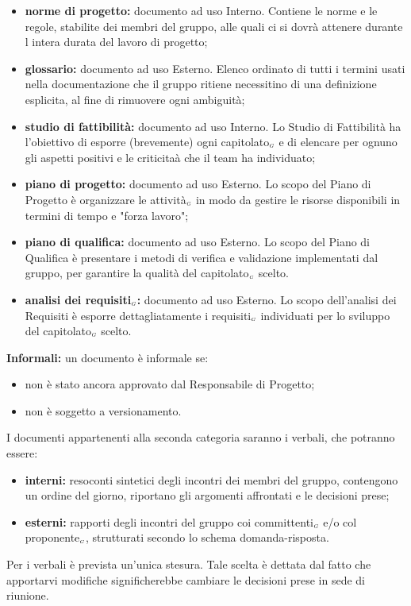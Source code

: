 \begin{itemize}
\item \textbf{norme di progetto:} documento ad uso Interno. Contiene le norme e le regole, stabilite dei membri del gruppo, alle quali ci si dovrà attenere durante l intera durata del lavoro di progetto;
	\item \textbf{glossario:} documento ad uso Esterno. Elenco ordinato di tutti i termini usati nella documentazione che il gruppo ritiene necessitino di una definizione esplicita, al fine di rimuovere ogni ambiguità;
		\item \textbf{studio di fattibilità:} documento ad uso Interno. Lo Studio di Fattibilità ha l’obiettivo di esporre (brevemente) ogni capitolato$_{\scaleto{G}{3pt}}$ e di elencare per ognuno gli aspetti positivi e le criticitaà che il team ha individuato;
			\item \textbf{piano di progetto:} documento ad uso Esterno. Lo scopo del Piano di Progetto è organizzare le attività$_{\scaleto{G}{3pt}}$ in modo da gestire le risorse disponibili in termini di tempo e "forza lavoro";
				\item \textbf{piano di qualifica:} documento ad uso Esterno. Lo scopo del Piano di Qualifica è presentare i metodi di verifica e validazione implementati dal gruppo, per garantire la qualità del capitolato$_{\scaleto{G}{3pt}}$ scelto.
					\item \textbf{analisi dei requisiti$_{\scaleto{G}{3pt}}$:} documento ad uso Esterno. Lo scopo dell'analisi dei Requisiti è esporre dettagliatamente i requisiti$_{\scaleto{G}{3pt}}$ individuati per lo sviluppo del capitolato$_{\scaleto{G}{3pt}}$ scelto.
\end{itemize}
 \textbf{Informali:} un documento è informale se:
\begin{itemize}
\item non è stato ancora approvato dal Responsabile di Progetto;
	\item non è soggetto a versionamento.
\end{itemize}
I documenti appartenenti alla seconda categoria saranno i verbali, che potranno
essere:
\begin{itemize}
\item \textbf{interni:} resoconti sintetici degli incontri dei membri del gruppo, contengono un ordine del giorno, riportano gli argomenti affrontati e le decisioni prese;
	\item \textbf{esterni:} rapporti degli incontri del gruppo coi committenti$_{\scaleto{G}{3pt}}$ e/o col proponente$_{\scaleto{G}{3pt}}$, strutturati secondo lo schema domanda-risposta.
\end{itemize}
Per i verbali è prevista un’unica stesura. Tale scelta è dettata dal fatto che apportarvi modifiche significherebbe cambiare le decisioni prese in sede di riunione.
